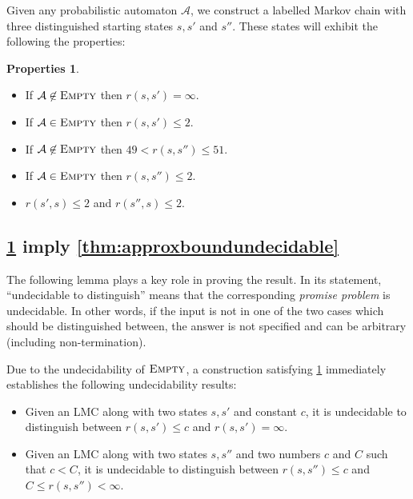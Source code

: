 \documentclass{lmcs}
\theoremstyle{plain}
\theoremstyle{definition}
\newtheorem{properties}[thm]{Properties}
\theoremstyle{remark}
\newcommand\tvra{\mathit{r}}
\newcommand\pa{\mathcal{A}}
\begin{document}
Given any probabilistic automaton $\mathcal{A}$, we construct a labelled Markov chain with three distinguished starting states $s,s'$ and $s''$. These states will exhibit the following the  properties:
\begin{properties}\hfill
  \label{pty:constrctuionprops}
\begin{itemize}
\item If $\pa \not\in\textsc{Empty}$ then $\tvra(s,s') = \infty$.
\item If $\pa \in\textsc{Empty}$ then $\tvra(s,s') \le 2$.
\item If $\pa \not\in\textsc{Empty}$ then $49 < \tvra(s,s'') \le 51$.
\item If $\pa\in\textsc{Empty}$ then $\tvra(s,s'') \le 2$.
\item $\tvra(s',s)\le 2$ and $\tvra(s'',s)\le 2$.
\end{itemize}
\end{properties}
\subsection{\texorpdfstring{\cref{pty:constrctuionprops}}{Properties~\ref{pty:constrctuionprops}} imply \texorpdfstring{\cref{thm:approxboundundecidable}}{Theorem~\ref{thm:approxboundundecidable}}}
\label{sec:undeci:implytheorem}

The following lemma plays a key role in proving the result. In its statement, ``undecidable to distinguish''
means that the corresponding \emph{promise problem} is undecidable. In other words, if the input  is not in one of the
two cases which should be distinguished between, the answer is not specified and can be arbitrary (including non-termination).

Due to the undecidability of $\textsc{Empty}$, a construction satisfying \cref{pty:constrctuionprops} immediately establishes the following undecidability results:
\begin{lem}\label{lemma:technical:boundedandgap} \hfill
\begin{itemize}
\item  Given an LMC along with two states $s,s'$ and constant $c$, it is undecidable to distinguish between $\tvra(s,s') \le c$ and $\tvra(s,s') = \infty$.
\item Given an LMC along with two states $s,s''$ and two numbers $c$ and $C$ such that  $c < C$, it is undecidable to distinguish between $\tvra(s,s'') \le c$ and $C \le \tvra(s,s'') < \infty$.
\end{itemize}
\end{lem}
\end{document}
